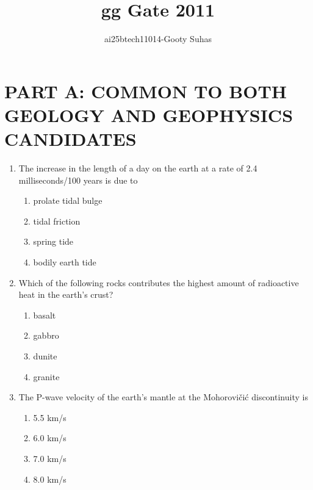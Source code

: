 \documentclass[journal,12pt,onecolumn]{IEEEtran}
\theoremstyle{remark}
\begin{document}
\title{gg Gate 2011}
\author{ai25btech11014-Gooty Suhas}
\maketitle

\section*{\textbf{PART A: COMMON TO BOTH GEOLOGY AND GEOPHYSICS CANDIDATES}}
\vspace{0.5cm}


\begin{enumerate}
\item The increase in the length of a day on the earth at a rate of 2.4 milliseconds/100 years is due to
\begin{multicols}{2}
\begin{enumerate}
\item prolate tidal bulge  
\item tidal friction  
\item spring tide  
\item bodily earth tide  
\end{enumerate}
\end{multicols}

\item Which of the following rocks contributes the highest amount of radioactive heat in the earth's crust?
\begin{multicols}{4}
\begin{enumerate}
\item basalt  
\item gabbro  
\item dunite  
\item granite  
\end{enumerate}
\end{multicols}

\item The P-wave velocity of the earth's mantle at the Mohorovi\v{c}i\'c discontinuity is
\begin{multicols}{4}
\begin{enumerate}
\item 5.5 km/s  
\item 6.0 km/s  
\item 7.0 km/s  
\item 8.0 km/s  
\end{enumerate}
\end{multicols}



\end{enumerate}
\end{document}
